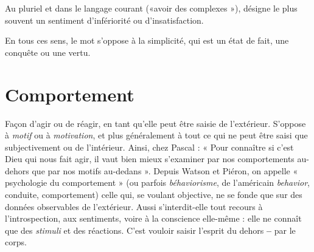 Au pluriel et dans le langage courant («avoir des complexes »), désigne le
plus souvent un sentiment d’infériorité ou d’insatisfaction.

En tous ces sens, le mot s’oppose à la simplicité, qui est un état de fait, une
conquête ou une vertu.

\section{Comportement}
Façon d’agir ou de réagir, en tant qu’elle peut être
saisie de l’extérieur. S’oppose à {\it motif} ou à {\it motivation},
et plus généralement à tout ce qui ne peut être saisi que subjectivement ou de
l’intérieur. Ainsi, chez Pascal : « Pour connaître si c’est Dieu qui nous fait agir,
il vaut bien mieux s’examiner par nos comportements au-dehors que par nos
motifs au-dedans ». Depuis Watson et Piéron, on appelle « psychologie du
comportement » (ou parfois {\it béhaviorisme}, de l'américain {\it behavior}, conduite,
comportement) celle qui, se voulant objective, ne se fonde que sur des données
observables de l'extérieur. Aussi s’interdit-elle tout recours à l’introspection,
aux sentiments, voire à la conscience elle-même : elle ne connaît que des {\it stimuli}
et des réactions. C’est vouloir saisir l’esprit du dehors {\bf --} par le corps.

